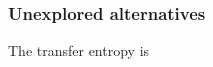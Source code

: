 %

\subsubsection{Unexplored alternatives}
The transfer entropy \cite{Bossomaier2016introductiontransferentropy} is


